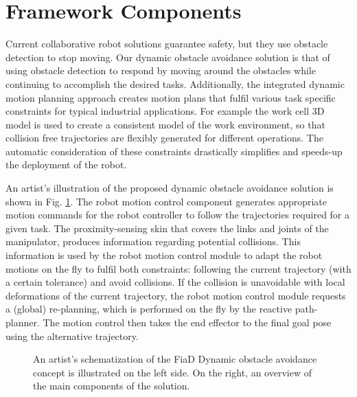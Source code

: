\section{Framework Components}
\label{sec:framework}
Current collaborative robot solutions guarantee safety, but they use
obstacle detection to stop moving. Our dynamic obstacle avoidance
solution is that of using obstacle detection to respond by moving around the
obstacles while continuing to accomplish the desired tasks. Additionally, the integrated dynamic motion planning approach creates motion
plans that fulfil various task specific constraints for typical industrial
applications. For example the work cell 3D model is used to create a consistent
model of the work environment, so that collision free trajectories are flexibly 
generated for different operations. The automatic consideration of these
constraints  drastically simplifies and speeds-up the deployment of the robot.

An artist's illustration of the proposed dynamic obstacle avoidance solution is shown
in Fig. \ref{fig:overview}. The robot motion control component generates
appropriate motion commands for the robot controller to follow the trajectories required for a given task. The proximity-sensing skin that covers the links and joints of the manipulator, produces information regarding potential collisions. This information is used by the robot motion control
module to adapt the robot motions on the fly to fulfil both constraints:
following the current trajectory (with a certain tolerance) and avoid
collisions. If the collision is unavoidable with local deformations of the
current trajectory, the robot motion control module requests a (global) re-planning,
which is performed on the fly by the reactive path-planner. The motion control
then takes the end effector to the final goal pose using the alternative
trajectory. 

\begin{figure}[t]
\centering
{}
\caption[]{An artist's schematization of the FiaD Dynamic obstacle avoidance
concept is illustrated on the left side. On the right, an overview of the main
components of the solution.}
\label{fig:overview}

\end{figure}


